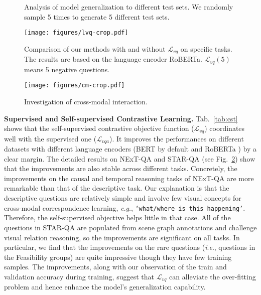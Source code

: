 \documentclass[10pt,journal,compsoc]{IEEEtran}
\newcommand{\ie}{\textit{i}.\textit{e}.}
\newcommand{\eg}{\textit{e}.\textit{g}.}
\begin{document}
\begin{figure}[t!]
  \begin{center}
  \end{center}
  \vspace{-1.0em}
  \caption{Analysis of model generalization to different test sets. We randomly sample 5 times to generate 5 different test sets.}
  \label{fig:newans}
\vspace{-0.4cm}
\end{figure}

\begin{figure}[t!]
  \begin{center}
    \texttt{[image: figures/lvq-crop.pdf]}
  \end{center}
  \vspace{-1em}
  \caption{Comparison of our methods with and without $\mathcal{L}_{vq}$ on specific tasks. The results are based on the language encoder RoBERTa. $\mathcal{L}_{vq}(5)$ means 5 negative questions.}
  \label{fig:cst}
\end{figure}

\begin{figure*}[t!]
  \begin{center}
    \texttt{[image: figures/cm-crop.pdf]}
  \end{center}
  \vspace{-0.4cm}
  \caption{Investigation of cross-modal interaction.}
  \label{fig:cm}
  \vspace{-0.4cm}
\end{figure*}
\textbf{Supervised and Self-supervised Contrastive Learning.}
Tab.~\ref{tab:cst} shows that the self-supervised contrastive objective function ($\mathcal{L}_{vq}$) coordinates well with the supervised one ($\mathcal{L}_{vqa}$). It improves the performances on different datasets with different language encoders (BERT \cite{devlin2018bert} by default and RoBERTa \cite{liu2019roberta}) by a clear margin. The detailed results on NExT-QA and STAR-QA (see Fig.~\ref{fig:cst}) show that the improvements are also stable across different tasks. Concretely, the improvements on the causal and temporal reasoning tasks of NExT-QA are more remarkable than that of the descriptive task. Our explanation is that the descriptive questions are relatively simple and involve few visual concepts for cross-modal correspondence learning, \eg, \texttt{`what/where is this happening'}. Therefore, the self-supervised objective helps little in that case. All of the questions in STAR-QA are populated from scene graph annotations and challenge visual relation reasoning, so the improvements are significant on all tasks. In particular, we find that the improvements on the rare questions (\ie, questions in the Feasibility groups) are quite impressive though they have few training samples. The improvements, along with our observation of the train and validation accuracy during training, suggest that $\mathcal{L}_{vq}$ can alleviate the over-fitting problem and hence enhance the model's generalization capability.
\end{document}
